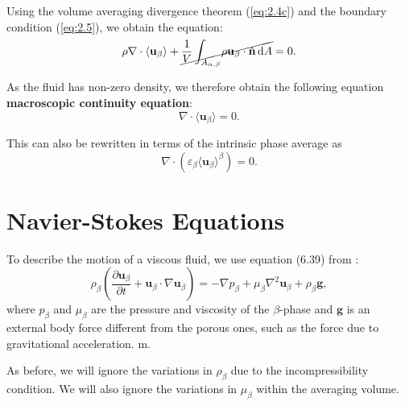 \documentclass[a4paper, 11pt]{report}
\begin{document}
Using the volume averaging divergence theorem (\ref{eq:2.4c}) and the boundary condition (\ref{eq:2.5}), we obtain the equation:
\begin{equation*}
	\rho\nabla\cdot\langle\mathbf{u}_{\beta}\rangle + \cancel{\frac{1}{V} \int_{A_{\alpha,\beta}} \! \rho\mathbf{u}_{\beta} \cdot \hat{\mathbf{n}} \, \mathrm{d}A} = 0.
\end{equation*}

As the fluid has non-zero density, we therefore obtain the following equation \textbf{macroscopic continuity equation}:
\begin{equation}
    \boxed{\nabla\cdot\langle\mathbf{u}_{\beta}\rangle = 0.} \label{eq:2.7}
\end{equation}

This can also be rewritten in terms of the intrinsic phase average as
\begin{equation}
	\nabla\cdot(\varepsilon_\beta\langle\mathbf{u}_{\beta}\rangle^\beta) = 0. \label{eq:2.8}
\end{equation}

\section{Navier-Stokes Equations}
To describe the motion of a viscous fluid, we use equation (6.39) from \cite[Chapter~6]{fmnotes}:
\begin{equation}
	\rho_{\beta}\left(\frac{\partial \mathbf{u}_{\beta}}{\partial t} + \mathbf{u}_{\beta} \cdot \nabla \mathbf{u}_{\beta} \right) = -\nabla p_{\beta} + \mu_{\beta} \nabla^2 \mathbf{u}_{\beta} + \rho_{\beta} \mathbf{g}, \label{eq:2.9}
\end{equation}
where $p_\beta$ and $\mu_\beta$ are the pressure and viscosity of the $\beta$-phase and $\mathbf{g}$ is an external body force different from the porous ones, such as the force due to gravitational acceleration. %
m.

As before, we will ignore the variations in $\rho_{\beta}$ due to the incompressibility condition. We will also ignore the variations in $\mu_{\beta}$ within the averaging volume. %
\end{document}
